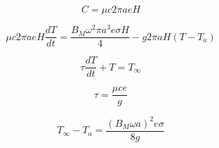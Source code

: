 {\begin{equation}
  C = \mu c 2 \pi a e H
\end{equation}


\begin{equation}
  \mu c 2 \pi a e H \frac{dT}{dt} = \frac{B_M \omega^2 \pi a^3 e \sigma H}{4} - g 2 \pi a H (T-T_a)
\end{equation}


\begin{equation}
  \tau  \frac{dT}{dt} + T = T_{\infty}
\end{equation}


\begin{equation}
  \tau  = \frac{\mu  c e}{g}
\end{equation}

\begin{equation}
  T_{\infty} - T_a = \frac{(B_M \omega a)^2 e \sigma}{8g}
\end{equation}
}



